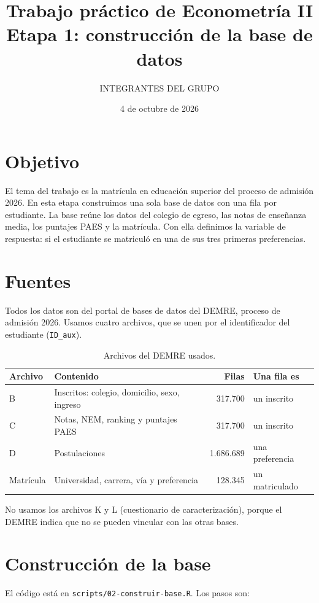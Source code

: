 \documentclass[11pt,letterpaper]{article}
\title{Trabajo práctico de Econometría II\\Etapa 1: construcción de la base de datos}
\author{INTEGRANTES DEL GRUPO}
\date{4 de octubre de 2026}
\begin{document}
\maketitle

\section{Objetivo}

El tema del trabajo es la matrícula en educación superior del proceso de admisión 2026. En esta etapa construimos una sola base de datos con una fila por estudiante. La base reúne los datos del colegio de egreso, las notas de enseñanza media, los puntajes PAES y la matrícula. Con ella definimos la variable de respuesta: si el estudiante se matriculó en una de sus tres primeras preferencias.

\section{Fuentes}

Todos los datos son del portal de bases de datos del DEMRE, proceso de admisión 2026. Usamos cuatro archivos, que se unen por el identificador del estudiante (\texttt{ID\_aux}).

\begin{table}[h]
\centering
\begin{tabular}{llrl}
\toprule
Archivo & Contenido & Filas & Una fila es \\
\midrule
B & Inscritos: colegio, domicilio, sexo, ingreso & 317.700 & un inscrito \\
C & Notas, NEM, ranking y puntajes PAES & 317.700 & un inscrito \\
D & Postulaciones & 1.686.689 & una preferencia \\
Matrícula & Universidad, carrera, vía y preferencia & 128.345 & un matriculado \\
\bottomrule
\end{tabular}
\caption{Archivos del DEMRE usados.}
\end{table}

No usamos los archivos K y L (cuestionario de caracterización), porque el DEMRE indica que no se pueden vincular con las otras bases.

\section{Construcción de la base}

El código está en \texttt{scripts/02-construir-base.R}. Los pasos son:
\end{document}
